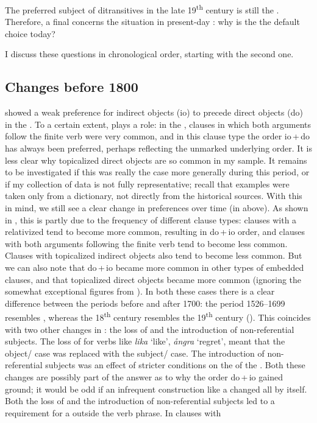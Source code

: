 \documentclass[output=paper]{langscibook}
\begin{document}
The preferred subject of  ditransitives in the late 19\textsuperscript{th} century is still the . Therefore, a final  concerns the situation in present-day : why is the  the default choice today?



I discuss these questions in chronological order, starting with the second one.


\subsection{Changes before 1800}\label{sec:falk:5.1}


 showed a weak preference for indirect objects (io) to precede direct objects (do) in the . To a certain extent,  plays a role: in the , clauses in which both arguments follow the finite verb were very common, and in this clause type the order io\,+\,do has always been preferred, perhaps reflecting the unmarked underlying order. It is less clear why topicalized direct objects are so common in my  sample. It remains to be investigated if this was really the case more generally during this period, or if my collection of data is not fully representative; recall that examples were taken only from a dictionary, not directly from the historical sources. With this in mind, we still see a clear change in preferences over time (in  above). As shown in , this is partly due to the frequency of different clause types: clauses with a relativized  tend to become more common, resulting in do\,+\,io order, and clauses with both arguments following the finite verb tend to become less common. Clauses with topicalized indirect objects also tend to become less common. But we can also note that do\,+\,io became more common in other types of embedded clauses, and that topicalized direct objects became more common (ignoring the somewhat exceptional figures from ). In both these cases there is a clear difference between the periods before and after 1700: the period 1526–1699 resembles , whereas the 18\textsuperscript{th} century resembles the 19\textsuperscript{th} century (). This coincides with two other changes in : the loss of  and the introduction of non-referential subjects. The loss of  for verbs like \textit{lika} ‘like’, \textit{ångra} ‘regret’, meant that the object/ case was replaced with the subject/ case. The introduction of non-referential subjects was an effect of stricter conditions on the  of the  \citep{Falk1993}. Both these changes are possibly part of the answer as to why the order do\,+\,io gained ground; it would be odd if an infrequent construction like a   changed all by itself. Both the loss of  and the introduction of non-referential subjects led to a requirement for a   outside the verb phrase. In clauses with 
\end{document}
